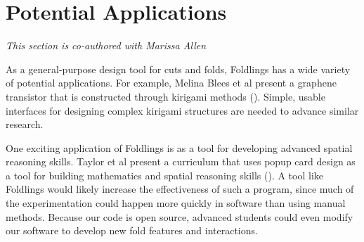 \section{Potential Applications}\label{potential-applications}

\emph{This section is co-authored with Marissa Allen}

As a general-purpose design tool for cuts and folds, Foldlings has a
wide variety of potential applications. For example, Melina Blees et al
present a graphene transistor that is constructed through kirigami
methods (\citet{blees2014graphene}). Simple, usable interfaces for
designing complex kirigami structures are needed to advance similar
research.

One exciting application of Foldlings is as a tool for developing
advanced spatial reasoning skills. Taylor et al present a curriculum
that uses popup card design as a tool for building mathematics and
spatial reasoning skills \citet{taylor2013think3d}
(\citet{olson_mathematics_2004}). A tool like Foldlings would likely
increase the effectiveness of such a program, since much of the
experimentation could happen more quickly in software than using manual
methods. Because our code is open source, advanced students could even
modify our software to develop new fold features and interactions.
